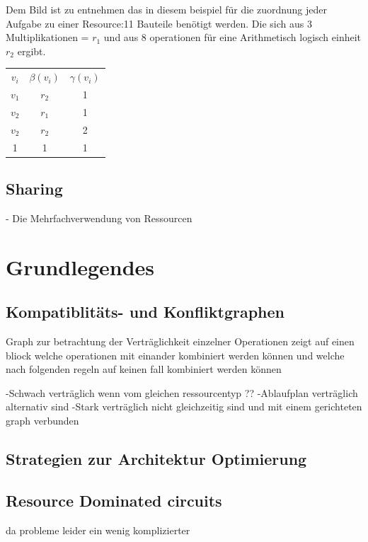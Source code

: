 \documentclass[conference]{IEEEtran}
\begin{document}
Dem Bild ist zu entnehmen das in diesem beispiel für die zuordnung jeder Aufgabe zu einer Resource:11 Bauteile benötigt werden.
 Die sich aus 3 Multiplikationen = $r_1$ und aus 8 operationen für eine Arithmetisch logisch einheit $r_2$ ergibt.\\
\begin{tabular}[h]{ccc}
$v_i$&$\beta(v_i)$&$\gamma(v_i)$\\
$v_1$&$r_2$&1\\
$v_2$&$r_1$&1\\
$v_2$&$r_2$&2\\
1&1&1\\
\end{tabular}







\subsection{Sharing}
- Die Mehrfachverwendung von Ressourcen 
\section{Grundlegendes}
\subsection{Kompatiblitäts- und Konfliktgraphen}
Graph zur betrachtung der Verträglichkeit einzelner Operationen
zeigt auf einen bliock welche operationen mit einander kombiniert werden können und welche nach folgenden regeln auf keinen fall kombiniert werden können

-Schwach verträglich
wenn vom gleichen ressourcentyp ?? 
-Ablaufplan verträglich
alternativ sind
-Stark verträglich
nicht gleichzeitig sind und mit einem gerichteten graph verbunden 


\subsection{Strategien zur Architektur Optimierung}

\subsection{Resource Dominated circuits}
da probleme leider ein wenig komplizierter 
\end{document}
